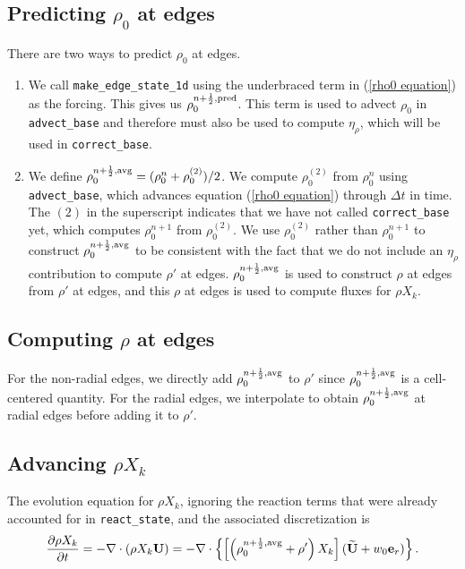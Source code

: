 \subsection{Predicting $\rho_0$ at edges}\label{Predicting rho0 at edges}
There are two ways to predict $\rho_0$ at edges.
\begin{enumerate}
\item We call {\tt make\_edge\_state\_1d} using the underbraced term
in (\ref{rho0 equation}) as the forcing.  This gives us
$\rho_0^{n+\frac{1}{2},{\rm pred}}$.  This term is used to advect $\rho_0$
in {\tt advect\_base} and therefore must also be used to compute
$\eta_\rho$, which will be used in {\tt correct\_base}.
\item We define $\rho_0^{n+\frac{1}{2},{\rm avg}} = (\rho_0^n +
\rho_0^{(2)})/2$.  We compute $\rho_0^{(2)}$ from $\rho_0^n$ using
{\tt advect\_base}, which advances equation (\ref{rho0 equation})
through $\Delta t$ in time.  The $(2)$ in the superscript indicates
that we have not called {\tt correct\_base} yet, which computes
$\rho_0^{n+1}$ from $\rho_0^{(2)}$.  We use $\rho_0^{(2)}$ rather than
$\rho_0^{n+1}$ to construct $\rho_0^{n+\frac{1}{2},{\rm avg}}$ to be
consistent with the fact that we do not include an $\eta_\rho$
contribution to compute $\rho'$ at edges.  $\rho_0^{n+\frac{1}{2},{\rm
avg}}$ is used to construct $\rho$ at edges from $\rho'$ at edges, and
this $\rho$ at edges is used to compute fluxes for $\rho X_k$.
\end{enumerate}

\subsection{Computing $\rho$ at edges}\label{Computing rho at edges}
For the non-radial edges, we directly add $\rho_0^{n+\frac{1}{2},{\rm avg}}$
to $\rho'$ since $\rho_0^{n+\frac{1}{2},{\rm avg}}$ is a cell-centered
quantity.  For the radial edges, we interpolate to obtain
$\rho_0^{n+\frac{1}{2},{\rm avg}}$ at radial edges before adding it to
$\rho'$.

\subsection{Advancing $\rho X_k$}\label{Advancing rhoX_k}
The evolution equation for $\rho X_k$, ignoring the reaction terms
that were already accounted for in {\tt react\_state}, and the
associated discretization is
\begin{equation}
\frac{\partial\rho X_k}{\partial t} = -\nabla\cdot(\rho X_k{\bf U}) = 
-\nabla\cdot\left\{\left[\left(\rho_0^{n+\frac{1}{2},{\rm avg}} 
+ \rho'\right)X_k\right](\widetilde{{\bf U}}+w_0{\bf e}_r)\right\}.
\end{equation}


